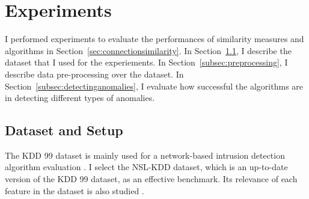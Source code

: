 \section{Experiments}
I performed experiments to evaluate the performances of similarity measures and algorithms in Section~\ref{sec:connectionsimilarity}.
\newline
In Section~\ref{subsec:datasetandsetup}, I describe the dataset that I used for the experiements.\newline
In Section~\ref{subsec:preprocessing}, I describe data pre-processing over the dataset.\newline
In Section~\ref{subsec:detectinganomalies}, I evaluate how successful the algorithms are in detecting different types of anomalies.

\subsection{Dataset and Setup}
\label{subsec:datasetandsetup}
The KDD 99 dataset is mainly used for a network-based intrusion detection algorithm evaluation \cite{tavallaee09}. 
I select the NSL-KDD dataset, which is an up-to-date version of the KDD 99 dataset, as an effective benchmark. 
Its relevance of each feature in the dataset is also studied \cite{olusola10} \cite{kayacik05}. 

